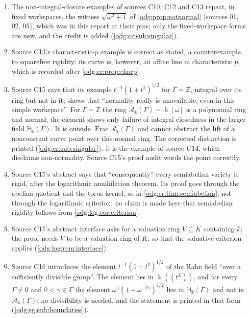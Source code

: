 \documentclass[11pt,oneside]{article}
\numberwithin{equation}{section}
\theoremstyle{definition}
\theoremstyle{remark}
\newcommand{\Z}{\mathbb Z}
\newcommand{\Frac}{\operatorname{Frac}}
\newcommand{\crH}{\mathbb H_\Bbbk(\Gamma)}
\newcommand{\crA}{\mathcal A_\Bbbk(\Gamma)}
\begin{document}
\begin{enumerate}[leftmargin=*]
that lemma, and Riemann--Roch is cited as Section 53.5 (Tag 0B5B) or as its Lemma
53.5.2 (Tag 0BS6); these are consistent. Milne's \emph{Abelian Varieties}, Chapter IV,
6.7 is called a proposition by sources C10 and C11 and a corollary by source C14;
this was not checked.
\item The non-integral-closure examples of sources C10, C12 and C13 repeat, in fixed
workspaces, the witness $\sqrt{\omega^2+1}$ of \cref{odg:prop:notnormal} (sources
01, 02, 05), which was in this report at their pins; only the fixed-workspace forms are
new, and the credit is added (\cref{odg:cr:sub:singular}).
\item Source C13's characteristic-$p$ example is correct as stated, a counterexample
to squarefree rigidity; its curve is, however, an affine line in characteristic $p$,
which is recorded after \cref{odg:cr:prop:charp}.
\item Source C15 says that its example $t^{-1}(1+t^2)^{1/2}$ for $\Gamma=\Z$, integral over
its ring but not in it, shows that ``normality really is unavailable, even in this simple
workspace''. For $\Gamma=\Z$ the ring $\crA=\Bbbk[\omega]$ is a polynomial ring and
normal; the element shows only failure of integral closedness in the larger
field $\crH$. It is outside $\Frac\crA$ and cannot obstruct the lift of
a nonconstant curve point over this normal ring. The corrected distinction is printed
(\cref{odg:cr:sub:singular}); it is the example of source C14, which disclaims
non-normality. Source C15's proof audit words the point correctly.
\item Source C15's abstract says that ``consequently'' every semiabelian variety is rigid,
after the logarithmic annihilation theorem. Its proof goes through the abelian quotient
and the torus kernel, as in \cref{odg:cr:thm:semiabelian}, not through the logarithmic
criterion; no claim is made here that semiabelian rigidity follows from
\cref{odg:log:cor:criterion}.
\item Source C15's abstract interface asks for a valuation ring $V\subseteq K$ containing
$k$; the proof needs $V$ to be a valuation ring of $K$, so that the valuative criterion
applies (\cref{odg:log:rem:interface}).
\item Source C16 introduces the element $t^{-1}(1+t^2)^{1/2}$ of the Hahn field ``over a
sufficiently divisible group''. The element lies in $\Bbbk((t^{\Z}))$, and for every
$\Gamma\ne0$ and $0<\gamma\in\Gamma$ the element $\omega^\gamma(1+\omega^{-2\gamma})^{1/2}$ lies in
$\crH$ and not in $\crA$; no divisibility is needed, and the statement is printed in that
form (\cref{odg:sg:sub:boundaries}).
\end{enumerate}
\end{document}
